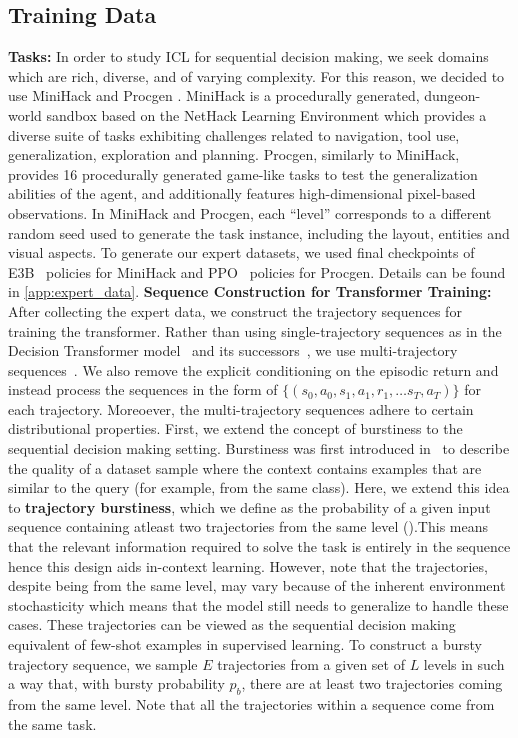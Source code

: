 \documentclass[]{fairmeta}
\begin{document}
\subsection{Training Data}
\label{sec:training_data}
\textbf{Tasks:} In order to study ICL for sequential decision making, we seek domains which are rich, diverse, and of varying complexity. For this reason, we decided to use MiniHack
\citep{samvelyan2021minihack} and Procgen \citep{cobbe2020leveraging}. MiniHack is a procedurally generated, dungeon-world sandbox based on the NetHack Learning Environment \citep{NLE} which provides a diverse suite of tasks exhibiting challenges related to navigation, tool use, generalization, exploration and planning.
Procgen, similarly to MiniHack, provides 16 procedurally generated game-like tasks to test the generalization abilities of the agent, and additionally features high-dimensional pixel-based observations.
In MiniHack and Procgen, each ``level'' corresponds to a different random seed used to generate the task instance, including the layout, entities and visual aspects.
To generate our expert datasets, we used final checkpoints of E3B~\citep{E3B} policies for MiniHack and PPO~\citep{cobbe2020leveraging} policies for Procgen. Details can be found in  \ref{app:expert_data}.
\textbf{Sequence Construction for Transformer Training: }
After collecting the expert data, we construct the trajectory sequences for training the transformer. Rather than using single-trajectory sequences as in the Decision Transformer model~\citep{decision_transformer} and its successors~\citep{traj_transformer, MGDT}, we use multi-trajectory sequences~\citep{adaptiveagentteam2023humantimescale, algo_dist}. We also remove the explicit conditioning on the episodic return and instead process the sequences in the form of $\{(s_0, a_0, s_1, a_1, r_1, \dots s_T, a_T)\}$ for each trajectory.
Moreoever, the multi-trajectory sequences adhere to certain distributional properties. First, we extend the concept of burstiness to the sequential decision making setting. Burstiness was first introduced in~\cite{zipfian_icl} to describe the quality of a dataset sample where the context contains examples that are similar to the query (for example, from the same class). Here, we extend this idea to \textbf{trajectory burstiness}, which we define as the probability of a given input sequence containing atleast two trajectories from the same level ().This means that the relevant information required to solve the task is entirely in the sequence hence this design aids in-context learning. However, note that the trajectories, despite being from the same level, may vary because of the inherent environment stochasticity which means that the model still needs to generalize to handle these cases. These trajectories can be viewed as the sequential decision making equivalent of few-shot examples in supervised learning. To construct a bursty trajectory sequence, we sample $E$ trajectories from a given set of $L$ levels in such a way that, with bursty probability $p_b$, there are at least two trajectories coming from the same level. Note that all the trajectories within a sequence come from the same task.
\end{document}
